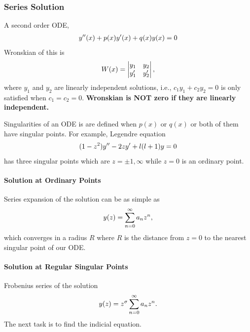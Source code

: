 \documentclass[letterpaper,10pt,english]{sphinxmanual}
\begin{document}
\subsubsection{Series Solution}
\label{equation-solving:series-solution}
A second order ODE,
\begin{gather}
\begin{split}y''(x)+p(x) y'(x) + q(x)y(x)=0\end{split}\notag
\end{gather}
Wronskian of this is
\begin{gather}
\begin{split}W(x) = \begin{vmatrix} y_1 & y_2 \\ y_1' & y_2' \end{vmatrix},\end{split}\notag
\end{gather}
where \(y_1\) and \(y_2\) are linearly independent solutions, i.e., \(c_1 y_1 + c_2 y_2=0\) is only satisfied when \(c_1=c_2=0\). \textbf{Wronskian is NOT zero if they are linearly independent.}

Singularities of an ODE is are defined when \(p(x)\) or \(q(x)\) or both of them have singular points. For example, Legendre equation
\begin{gather}
\begin{split}(1-z^2) y'' - 2 z y' + l(l+1) y = 0\end{split}\notag
\end{gather}
has three singular points which are \(z=\pm 1, \infty\) while \(z=0\) is an ordinary point.


\paragraph{Solution at Ordinary Points}
\label{equation-solving:solution-at-ordinary-points}
Series expansion of the solution can be as simple as
\begin{gather}
\begin{split}y(z) = \sum_{n=0}^{\infty} a_n z^n,\end{split}\notag
\end{gather}
which converges in a radius \(R\) where \(R\) is the distance from \(z=0\) to the nearest singular point of our ODE.


\paragraph{Solution at Regular Singular Points}
\label{equation-solving:solution-at-regular-singular-points}
Frobenius series of the solution
\begin{gather}
\begin{split}y(z) = z^\sigma \sum_{n=0}^{\infty} a_n z^n.\end{split}\notag
\end{gather}
The next task is to find the indicial equation.
\end{document}
